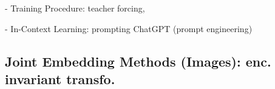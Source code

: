 

- Training Procedure: teacher forcing, 



- In-Context Learning: prompting ChatGPT (prompt engineering)


\subsection*{Joint Embedding Methods (Images): enc. invariant transfo.}



